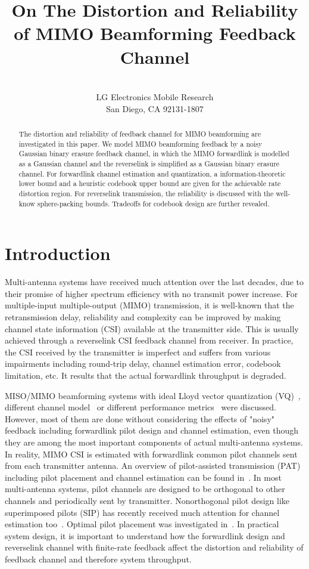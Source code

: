 \documentclass[10pt,fleqn, twocolumn]{IEEEtran}
\title{On The Distortion and Reliability of MIMO Beamforming Feedback Channel}
\author{\\LG Electronics Mobile Research\\San Diego, CA 92131-1807}
\date{}
\begin{document}
\maketitle
\begin{abstract}\small
The distortion and reliability of feedback channel for MIMO
beamforming are investigated in this paper. We model MIMO
beamforming feedback by a noisy Gaussian binary erasure feedback
channel, in which the MIMO forwardlink is modelled as a Gaussian
channel and the reverselink is simplified as a Gaussian binary
erasure channel. For forwardlink channel estimation and
quantization, a information-theoretic lower bound and a heuristic
codebook upper bound are given for the achievable rate distortion
region. For reverselink transmission, the reliability is discussed
with the well-know sphere-packing bounds. Tradeoffs for codebook
design are further revealed.
\end{abstract}

\section{Introduction}
Multi-antenna systems have received much attention over the last
decades, due to their promise of higher spectrum efficiency with
no transmit power increase. For multiple-input multiple-output
(MIMO) transmission, it is well-known that the retransmission
delay, reliability and complexity can be improved by making
channel state information (CSI) available at the transmitter side.
This is usually achieved through a reverselink CSI feedback
channel from receiver. In practice, the CSI received by the
transmitter is imperfect and suffers from various impairments
including round-trip delay, channel estimation error, codebook
limitation, etc. It results that the actual forwardlink throughput
is degraded.

MISO/MIMO beamforming systems with ideal Lloyd vector quantization
(VQ)~\cite{Narula98}, different channel model~\cite{Mukka03} or
different performance metrics~\cite{PXia04,Roh04} were discussed.
However, most of them are done without considering the effects of
"noisy" feedback including forwardlink pilot design and channel
estimation, even though they are among the most important
components of actual multi-antenna systems. In reality, MIMO CSI
is estimated with forwardlink common pilot channels sent from each
transmitter antenna. An overview of pilot-assisted transmission
(PAT) including pilot placement and channel estimation can be
found in~\cite{Tong04}. In most multi-antenna systems, pilot
channels are designed to be orthogonal to other channels and
periodically sent by transmitter. Nonorthogonal pilot design like
superimposed pilots (SIP) has recently received much attention for
channel estimation too~\cite{Coldrey06}. Optimal pilot placement
was investigated in~\cite{Dong02}. In practical system design, it
is important to understand how the forwardlink design and
reverselink channel with finite-rate feedback affect the
distortion and reliability of feedback channel and therefore
system throughput.
\end{document}
